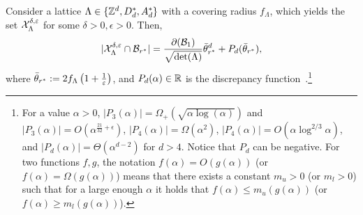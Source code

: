 \begin{thm}
\label{thm:general_sample_complexity}
    Consider a lattice $\Lambda\in \{\mathbb{Z}^d,D_d^*,A_d^*\}$ with a covering radius $f_\Lambda$, which yields the \decomp set $\mathcal{X}_{\Lambda}^{\delta,\varepsilon}$ for some $\delta>0,\epsilon>0$. %
    Then,
\begin{align}\label{eq:sample bounds}
        |\mathcal{X}_{\Lambda}^{\delta,\varepsilon}\cap \mathcal{B}_{r^*}|= 
        \frac{\partial(\mathcal{B}_1)}{\sqrt{\det(\Lambda)}}\Bar{\theta}_{r^*}^d + P_d(\Bar{\theta}_{r^*}),
    \end{align}
where $\Bar{\theta}_{r^*}:=2f_\Lambda\left(1+\frac{1}{\varepsilon}\right)$, and $P_d(\alpha)\in \mathbb{R}$ is the discrepancy function~\cite{ivic2004lattice}.\footnote{For a value $\alpha>0$, $|P_3(\alpha)|=\Omega_+(\sqrt{\alpha\log(\alpha)})$ and $|P_3(\alpha)|=O\left(\alpha^{\frac{21}{32}+\epsilon}\right)$, $|P_4(\alpha)|=\Omega(\alpha^{2})$, $|P_4(\alpha)|=O\left(\alpha\log^{2/3}\alpha\right)$, and $|P_d(\alpha)|=\Theta(\alpha^{d-2})$ for $d>4$. Notice that $P_d$ can be negative.  For two functions $f,g$, the notation $f(\alpha)=O(g(\alpha))$ (or $f(\alpha)=\Omega(g(\alpha))$)  means that there exists a constant $m_u>0$ (or $m_l>0$) such that for a large enough $\alpha$ it holds that $f(\alpha)\leq m_u(g(\alpha))$ (or $f(\alpha)\geq m_l(g(\alpha))$). %
}
\end{thm}


